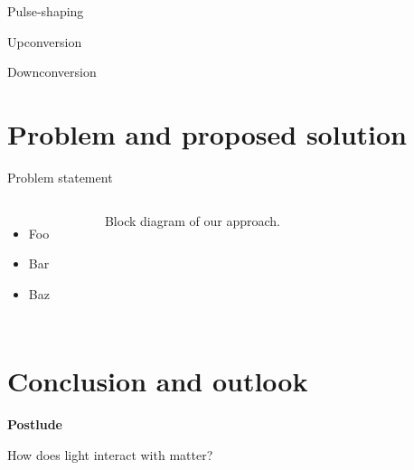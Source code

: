 \documentclass[aspectratio=169,usenames,dvipsnames]{beamer}
\begin{document}
	\begin{frame}{Pulse-shaping}
		
	\end{frame}
	
	\begin{frame}{Upconversion}
		
	\end{frame}
	
	\begin{frame}{Downconversion}
		
	\end{frame}
	
	\section{Problem and proposed solution}
	
	\begin{frame}{Problem statement}
		\begin{columns}[c, onlytextwidth]
			\begin{itemize}
			    \item Foo
			    \item Bar
			    \item Baz
			\end{itemize}
			
			\begin{figure}
				\caption{Block diagram of our approach.}
			\end{figure}
		\end{columns}
	\end{frame}
	
	\section{Conclusion and outlook}
	
	\begin{frame}
		\begin{center}
			\textbf{Postlude}
			
			How does light interact with matter?
		\end{center}
	\end{frame}
	
	\appendix
	
\end{document}
